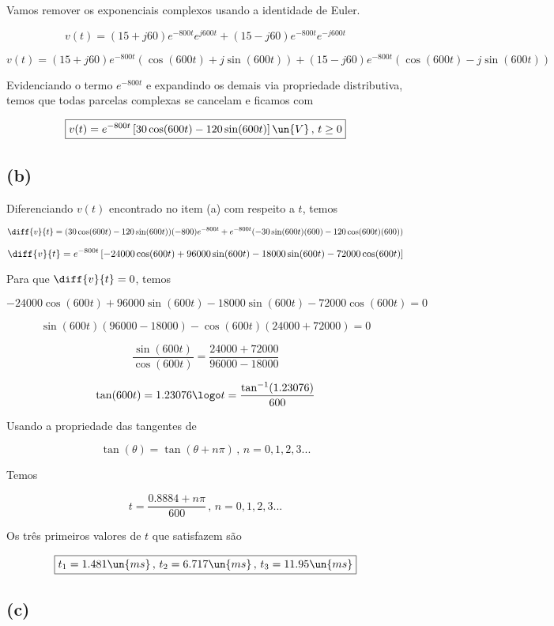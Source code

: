 Vamos remover os exponenciais complexos usando a identidade de Euler.

\[ v(t) = (15 + j60)e^{-800t}e^{j600t} + (15 - j60)e^{-800t}e^{-j600t} \]

\[ v(t) = (15 + j60)e^{-800t}(\cos(600t) + j\sin(600t)) + (15 - j60)e^{-800t}(\cos(600t) - j\sin(600t)) \]

Evidenciando o termo $e^{-800t}$ e expandindo os demais via propriedade distributiva, temos que todas 
parcelas complexas se cancelam e ficamos com

\[ \boxed{v(t) = e^{-800t}\left[30\cos(600t) - 120\sin(600t)\right] \un{V} \, , \, t \geq 0 }  \]

\subsection*{(b)}

Diferenciando $v(t)$ encontrado no item (a) com respeito a $t$, temos   

\[ \diff{v}{t} = (30\cos(600t) - 120\sin(600t))(-800)e^{-800t} + e^{-800t}(-30\sin(600t)(600) - 120\cos(600t)(600)) \]

\[ \diff{v}{t} = e^{-800t}\left[-24000\cos(600t) + 96000\sin(600t) - 18000\sin(600t) - 72000\cos(600t)\right]   \]

Para que $\diff{v}{t} = 0$, temos

\[ -24000\cos(600t) + 96000\sin(600t) - 18000\sin(600t) - 72000\cos(600t) = 0  \]

\[ \sin(600t)(96000 - 18000) - \cos(600t)(24000 + 72000) = 0  \]

\[ \frac{\sin(600t)}{\cos(600t)} = \frac{24000 + 72000}{96000 - 18000}  \]

\[ \tan(600t) = 1.23076 \logo t = \frac{\tan^{-1}(1.23076)}{600}  \]

Usando a propriedade das tangentes de 

\[ \tan(\theta) = \tan(\theta + n\pi) \, , \, n = 0, 1, 2, 3 ... \]

Temos  

\[ t = \frac{0.8884 + n\pi}{600} \, , \, n = 0, 1, 2, 3 ...  \]

Os três primeiros valores de $t$ que satisfazem são 

\[ \boxed{t_1 = 1.481 \un{ms} \, , \, t_2 = 6.717 \un{ms} \, , \, t_3 = 11.95 \un{ms}  }  \]

\subsection*{(c)}

